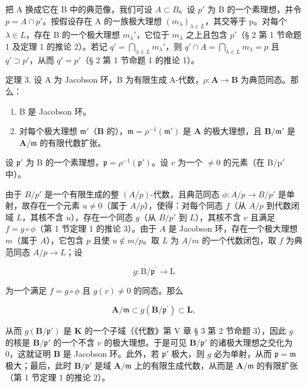 把 A 换成它在 B 中的典范像，我们可设 \(A \subset B\)。设 \(p'\) 为 B 的一个素理想，并令 \(p = A \cap p'\)。按假设存在 A 的一族极大理想 \((m_{\lambda})_{\lambda \in L}\)，其交等于 p。对每个 \(\lambda \in L\)，存在 B 的一个极大理想 \(m_{\lambda}'\)，它位于 \(m_{\lambda}\) 之上且包含 \(p'\)（§ 2 第 1 节命题 1 及定理 1 的推论 2）。若记 \(q' = \bigcap_{\lambda \in L} m_{\lambda}'\)，则 \(q' \cap A = \bigcap_{\lambda \in L} m_{\lambda} = p\) 且 \(q' \supset p'\)，从而 \(q' = p'\)（§ 2 第 1 节命题 1 的推论 1）。

定理 3. 设 A 为 Jacobson 环，B 为有限生成 A-代数，\(\rho: \mathbf{A} \to \mathbf{B}\) 为典范同态。那么：

\begin{enumerate}
\def\labelenumi{(\roman{enumi})}
\item
  B 是 Jacobson 环。
\item
  对每个极大理想 \(\mathfrak{m}'\)（\(\mathbf{B}\) 的），\(\mathfrak{m} = \rho^{-1} (\mathfrak{m}')\) 是 \(\mathbf{A}\) 的极大理想，且 \(\mathbf{B} / \mathfrak{m}'\) 是 \(\mathbf{A} / \mathfrak{m}\) 的有限代数扩张。
\end{enumerate}

设 \(\mathfrak{p}'\) 为 B 的一个素理想，\(\mathfrak{p} = \rho^{-1} (\mathfrak{p}')\)。设 \(v\) 为一个 \(\neq 0\) 的元素（在 \(\mathrm{B / p'}\) 中）。

由于 \(B/p'\) 是一个有限生成的整 \((A/p)\)-代数，且典范同态 \(\phi: A/p \to B/p'\) 是单射，故存在一个元素 \(u \neq 0\)（属于 \(A/p\)），使得：对每个同态 \(f\)（从 \(A/p\) 到代数闭域 \(L\)，其核不含 \(u\)），存在一个同态 \(g\)（从 \(B/p'\) 到 \(L\)），其核不含 \(v\) 且满足 \(f = g \circ \phi\)（第 1 节定理 1 的推论 3）。由于 \(A\) 是 Jacobson 环，存在一个极大理想 \(m\)（属于 \(A\)），它包含 \(p\) 且使 \(u \notin m/p\)。取 \(L\) 为 \(A/m\) 的一个代数闭包，取 \(f\) 为典范同态 \(A/p \to L\)；设

\[
g \colon \mathrm{B} / \mathfrak {p} ^ {\prime} \rightarrow \mathrm{L}
\]

为一个满足 \(f = g \circ \phi\) 且 \(g(v) \neq 0\) 的同态。那么

\[
\mathbf {A} / \mathfrak {m} \subset g (\mathbf {B} / \mathfrak {p} ^ {\prime}) \subset \mathbf {L},
\]

从而 \(g(\mathbf{B} / \mathfrak{p}')\) 是 \(\mathbf{K}\) 的一个子域（《代数》第 V 章 § 3 第 2 节命题 3），因此 \(g\) 的核是 \(\mathbf{B} / \mathfrak{p}'\) 的一个不含 \(v\) 的极大理想。于是可见 \(\mathbf{B} / \mathfrak{p}'\) 的诸极大理想之交化为 0，这就证明 \(\mathbf{B}\) 是 Jacobson 环。此外，若 \(\mathfrak{p}'\) 极大，则 \(g\) 必为单射，从而 \(\mathfrak{p} = \mathfrak{m}\) 极大；最后，此时 \(\mathbf{B} / \mathfrak{p}'\) 是域 \(\mathbf{A} / \mathfrak{m}\) 上的有限生成代数，从而是 \(\mathbf{A} / \mathfrak{m}\) 的有限扩张（第 1 节定理 1 的推论 2）。

